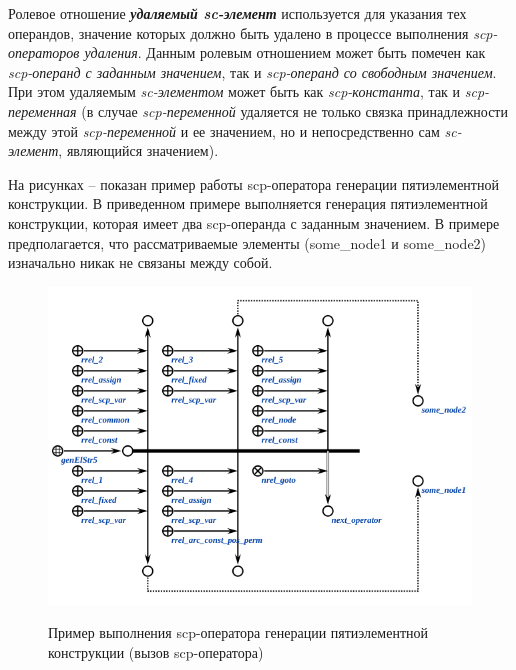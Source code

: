 Ролевое отношение \textbf{\textit{удаляемый sc-элемент\scnrolesign}} используется для указания тех операндов, значение которых должно быть удалено в процессе выполнения \textit{scp-операторов удаления}. Данным ролевым отношением может быть помечен как \textit{scp-операнд с заданным значением\scnrolesign}, так и \textit{scp-операнд со свободным значением\scnrolesign}. При этом удаляемым \textit{sc-элементом} может быть как \textit{scp-константа\scnrolesign}, так и \textit{scp-переменная\scnrolesign} (в случае \textit{scp-переменной\scnrolesign} удаляется не только связка принадлежности между этой \textit{scp-переменной\scnrolesign} и ее значением, но и непосредственно сам \textit{sc-элемент}, являющийся значением).

\begin{SCn}
\begin{scnhaselementset}
\end{scnhaselementset}
\begin{scnhaselementset}
\end{scnhaselementset}
\end{SCn}

На рисунках \textit{} -- \textit{} показан пример работы scp-оператора генерации пятиэлементной конструкции. В приведенном примере выполняется генерация пятиэлементной конструкции, которая имеет два scp-операнда с заданным значением. В примере предполагается, что рассматриваемые элементы (some\_node1 и some\_node2) изначально никак не связаны между собой.

\begin{figure}[H]
	\centering
	\caption{Пример выполнения scp-оператора генерации пятиэлементной конструкции (вызов scp-оператора)}
	\includegraphics[scale=0.8]{images/part3/chapter_situation_management/genElStr5_fafaa.png}
	\label{fig:genElStr5_fafaa}
\end{figure}

